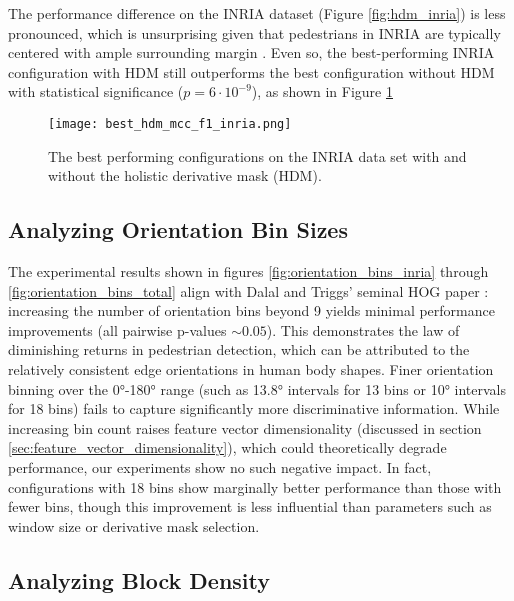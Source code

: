 The performance difference on the INRIA dataset (Figure \ref{fig:hdm_inria}) is less pronounced, which is unsurprising given that pedestrians in INRIA are typically centered with ample surrounding margin \cite{dalal_2005_histograms}. Even so, the best-performing INRIA configuration with HDM still outperforms the best configuration without HDM with statistical significance ($p=6\cdot 10^{-9}$), as shown in Figure \ref{fig:best_hdm_inria}

\begin{figure}
    \texttt{[image: best\_hdm\_mcc\_f1\_inria.png]}
    \caption{
        The best performing configurations on the INRIA data set with and without the holistic derivative mask (HDM). 
    }
    \label{fig:best_hdm_inria}
\end{figure}


\subsection{Analyzing Orientation Bin Sizes}

The experimental results shown in figures \ref{fig:orientation_bins_inria} through \ref{fig:orientation_bins_total} align with Dalal and Triggs' seminal HOG paper \cite{dalal_2005_histograms}: increasing the number of orientation bins beyond 9 yields minimal performance improvements (all pairwise p-values $\sim 0.05$). This demonstrates the law of diminishing returns in pedestrian detection, which can be attributed to the relatively consistent edge orientations in human body shapes. Finer orientation binning over the 0°-180° range (such as 13.8° intervals for 13 bins or 10° intervals for 18 bins) fails to capture significantly more discriminative information. While increasing bin count raises feature vector dimensionality (discussed in section \ref{sec:feature_vector_dimensionality}), which could theoretically degrade performance, our experiments show no such negative impact. In fact, configurations with 18 bins show marginally better performance than those with fewer bins, though this improvement is less influential than parameters such as window size or derivative mask selection.

\subsection{Analyzing Block Density}

